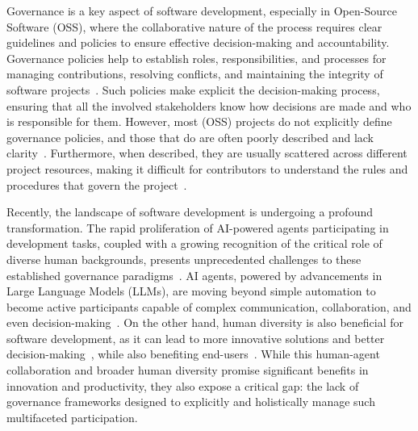 Governance is a key aspect of software development, especially in Open-Source Software (OSS), where the collaborative nature of the process requires clear guidelines and policies to ensure effective decision-making and accountability.
Governance policies help to establish roles, responsibilities, and processes for managing contributions, resolving conflicts, and maintaining the integrity of software projects~\cite{DBLP:journals/cacm/IzquierdoC23}.
Such policies make explicit the decision-making process, ensuring that all the involved stakeholders know how decisions are made and who is responsible for them.
However, most (OSS) projects do not explicitly define governance policies, and those that do are often poorly described and lack clarity~\cite{DBLP:journals/cacm/IzquierdoC23}.
Furthermore, when described, they are usually scattered across different project resources, making it difficult for contributors to understand the rules and procedures that govern the project~\cite{DBLP:conf/icse/IzquierdoC15}.

Recently, the landscape of software development is undergoing a profound transformation.
The rapid proliferation of AI-powered agents participating in development tasks, coupled with a growing recognition of the critical role of diverse human backgrounds, presents unprecedented challenges to these established governance paradigms~\cite{DBLP:journals/pacmhci/WesselSSWPCG18, DBLP:conf/xpu/RasheedWSKA0SA24, bjorn2023diversity, DBLP:journals/ese/Rodriguez-Perez21}.
AI agents, powered by advancements in Large Language Models (LLMs), are moving beyond simple automation to become active participants capable of complex communication, collaboration, and even decision-making~\cite{DBLP:conf/ijcai/GuoCWCPCW024}.
On the other hand, human diversity is also beneficial for software development, as it can lead to more innovative solutions and better decision-making~\cite{yang2022gender}, while also benefiting end-users~\cite{gunatilake2024impact}.
While this human-agent collaboration and broader human diversity promise significant benefits in innovation and productivity, they also expose a critical gap: the lack of governance frameworks designed to explicitly and holistically manage such multifaceted participation.


